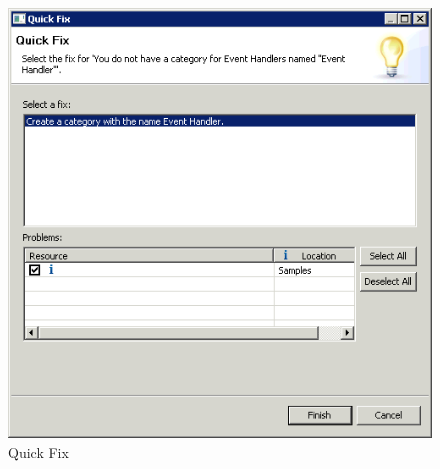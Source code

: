 \begin{figure}[p]
\begin{center}
\includegraphics{Tasks/Teststyle/PS/quickfix}
\caption{Quick Fix}
\label{quickfix}
\end{center}
\end{figure}
